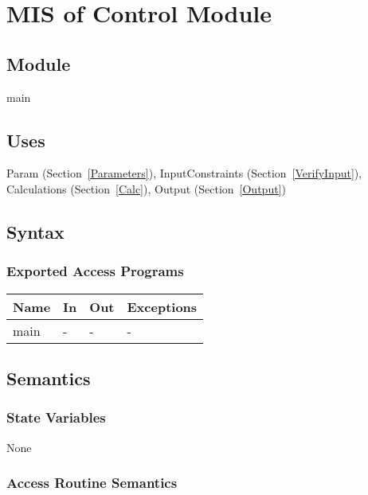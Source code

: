 \documentclass[12pt, titlepage]{article}
\begin{document}
\newpage

\section{MIS of Control Module} \label{Main}

\subsection{Module}

main

\subsection{Uses}

Param (Section~\ref{Parameters}), InputConstraints (Section~\ref{VerifyInput}),
Calculations (Section~\ref{Calc}),
Output (Section~\ref{Output})

\subsection{Syntax}

\subsubsection{Exported Access Programs}

\begin{center}
\begin{tabular}{p{2cm} p{4cm} p{4cm} p{2cm}}
\hline
\textbf{Name} & \textbf{In} & \textbf{Out} & \textbf{Exceptions} \\
\hline
main & - & - & - \\
\hline
\end{tabular}
\end{center}

\subsection{Semantics}

\subsubsection{State Variables}

None

\subsubsection{Access Routine Semantics}
\end{document}
